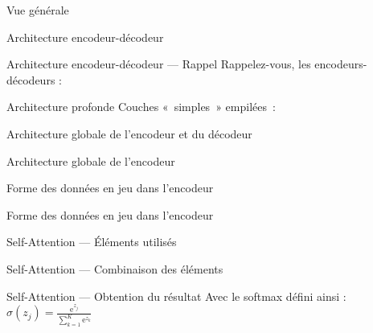 
\begin{frame}{Vue générale}
\end{frame}

\begin{frame}{Architecture encodeur-décodeur}
\end{frame}

\begin{frame}{Architecture encodeur-décodeur --- Rappel}
  Rappelez-vous, les encodeurs-décodeurs :
\end{frame}

\begin{frame}{Architecture profonde}
  Couches «~simples~» empilées~:
\end{frame}

\begin{frame}{Architecture globale de l'encodeur et du décodeur}
\end{frame}

\begin{frame}{Architecture globale de l'encodeur}
\end{frame}

\begin{frame}{Forme des données en jeu dans l'encodeur}
\end{frame}

\begin{frame}{Forme des données en jeu dans l'encodeur}
\end{frame}

\begin{frame}{Self-Attention --- Éléments utilisés}
\end{frame}

\begin{frame}{Self-Attention --- Combinaison des éléments}
\end{frame}

\begin{frame}{Self-Attention --- Obtention du résultat}
  Avec le softmax défini ainsi : $\sigma(z_j)=\frac {\mathrm{e}^{z_j}}{\sum _{k=1}^{K}\mathrm{e}^{z_{k}}}$
\end{frame}

